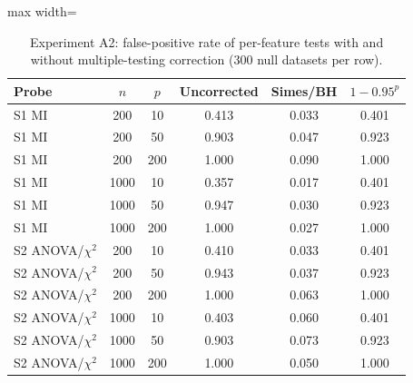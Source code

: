 \begin{table}[!t]
\centering
\caption{Experiment A2: false-positive rate of per-feature tests with and without multiple-testing correction (300 null datasets per row).}
\label{tab:multiple}
\footnotesize
\begin{adjustbox}{max width=\linewidth}
\begin{tabular}{lccccc}
\hline
Probe & $n$ & $p$ & Uncorrected & Simes/BH & $1-0.95^p$ \\ \hline
S1 MI & 200 & 10 & 0.413 & 0.033 & 0.401 \\
S1 MI & 200 & 50 & 0.903 & 0.047 & 0.923 \\
S1 MI & 200 & 200 & 1.000 & 0.090 & 1.000 \\
S1 MI & 1000 & 10 & 0.357 & 0.017 & 0.401 \\
S1 MI & 1000 & 50 & 0.947 & 0.030 & 0.923 \\
S1 MI & 1000 & 200 & 1.000 & 0.027 & 1.000 \\
S2 ANOVA/$\chi^2$ & 200 & 10 & 0.410 & 0.033 & 0.401 \\
S2 ANOVA/$\chi^2$ & 200 & 50 & 0.943 & 0.037 & 0.923 \\
S2 ANOVA/$\chi^2$ & 200 & 200 & 1.000 & 0.063 & 1.000 \\
S2 ANOVA/$\chi^2$ & 1000 & 10 & 0.403 & 0.060 & 0.401 \\
S2 ANOVA/$\chi^2$ & 1000 & 50 & 0.903 & 0.073 & 0.923 \\
S2 ANOVA/$\chi^2$ & 1000 & 200 & 1.000 & 0.050 & 1.000 \\
\hline
\end{tabular}
\end{adjustbox}
\end{table}
